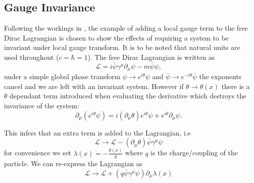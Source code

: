 \subsection{Gauge Invariance} %
\label{sub:gauge_invariance}
Following the workings in \cite{griffiths}, the example of adding a local gauge 
term to the free Dirac Lagrangian is chosen to show the effects of requiring a 
system to be invariant under local gauge transform. It is to be noted that 
natural units are used throughout ($c = \hbar = 1$). The free Dirac Lagrangian 
is written as
\begin{equation}
  \mathcal{L} = i\bar{\psi}\gamma^{\mu}\partial_{\mu}\psi - m\bar{\psi}\psi,
  \label{eq:freeDiracL}
\end{equation}
under a simple global phase transform $\psi\rightarrow e^{i\theta}\psi$ and 
$\bar{\psi}\rightarrow e^{-i\theta}\bar{\psi}$ the exponents cancel and we are 
left with an invariant system. However if $\theta\rightarrow\theta (x)$ there 
is a $\theta$ dependant term introduced when evaluating the derivative which 
destroys the invariance of the system:
\begin{equation}
  \partial_{\mu}\left(e^{i\theta}\psi\right) = i\left(\partial_{\mu}\theta\right)e^{i\theta}\psi + e^{i\theta}\partial_{\mu}\psi.
\end{equation} 

This infers that an extra term is added to the Lagrangian, i.e
\begin{equation}
  \mathcal{L}\rightarrow\mathcal{L}-\left(\partial_{\mu}\theta\right)\bar{\psi}\gamma^{\mu}\psi
\end{equation}
for convenience we set $\lambda(x) = -\frac{\theta(x)}{q}$ where $q$ is the 
charge/coupling of the particle. We can re-express the Lagrangian as
\begin{equation}  \mathcal{L} \rightarrow \mathcal{L} + \left( q\bar{\psi}\gamma^{\mu} \psi \right) \partial_{\mu} \lambda(x)
  \label{eq:diracLplusLambda}
\end{equation}

